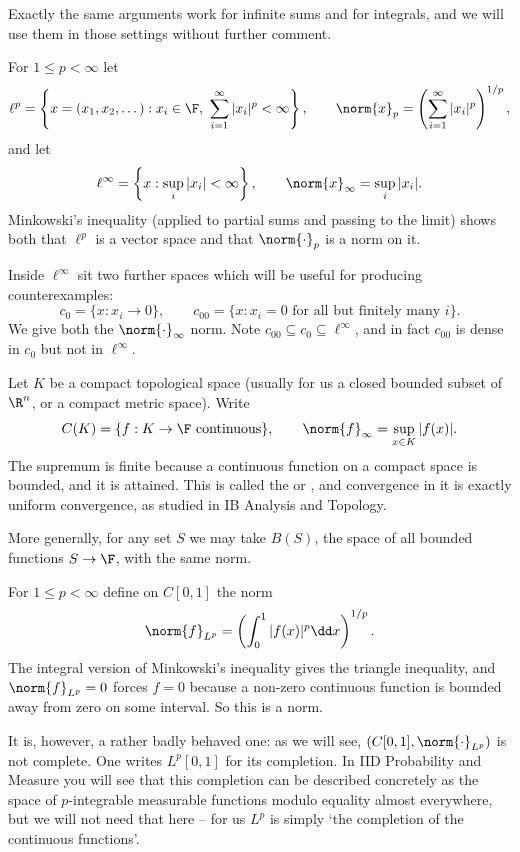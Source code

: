 Exactly the same arguments work for infinite sums and for integrals, and we will use them in those settings without further comment.

\begin{example}
	For $1 \leq p < \infty$ let
	$$\ell^p = \left\{ x = (x_1, x_2, \dots) : x_i \in \F, \ \sum_{i=1}^\infty |x_i|^p < \infty \right\}, \qquad \norm{x}_p = \left( \sum_{i=1}^\infty |x_i|^p \right)^{1/p},$$
	and let
	$$\ell^\infty = \left\{ x : \sup_i |x_i| < \infty \right\}, \qquad \norm{x}_\infty = \sup_i |x_i|.$$
	Minkowski's inequality (applied to partial sums and passing to the limit) shows both that $\ell^p$ is a vector space and that $\norm{\cdot}_p$ is a norm on it.

	Inside $\ell^\infty$ sit two further spaces which will be useful for producing counterexamples:
	$$c_0 = \{ x : x_i \to 0 \}, \qquad c_{00} = \{ x : x_i = 0 \text{ for all but finitely many } i \}.$$
	We give both the $\norm{\cdot}_\infty$ norm. Note $c_{00} \subseteq c_0 \subseteq \ell^\infty$, and in fact $c_{00}$ is dense in $c_0$ but not in $\ell^\infty$.
\end{example}

\begin{example}
	Let $K$ be a compact topological space (usually for us a closed bounded subset of $\R^n$, or a compact metric space). Write
	$$C(K) = \{ f : K \to \F \ \text{continuous} \}, \qquad \norm{f}_\infty = \sup_{x \in K} |f(x)|.$$
	The supremum is finite because a continuous function on a compact space is bounded, and it is attained. This is called the  or , and convergence in it is exactly uniform convergence, as studied in IB Analysis and Topology.

	More generally, for any set $S$ we may take $B(S)$, the space of all bounded functions $S \to \F$, with the same norm.
\end{example}

\begin{example}[$L^p$ spaces]
	For $1 \leq p < \infty$ define on $C[0,1]$ the norm
	$$\norm{f}_{L^p} = \left( \int_0^1 |f(x)|^p \dd x \right)^{1/p}.$$
	The integral version of Minkowski's inequality gives the triangle inequality, and $\norm{f}_{L^p} = 0$ forces $f = 0$ because a non-zero continuous function is bounded away from zero on some interval. So this is a norm.

	It is, however, a rather badly behaved one: as we will see, $(C[0,1], \norm{\cdot}_{L^p})$ is not complete. One writes $L^p[0,1]$ for its completion. In IID Probability and Measure you will see that this completion can be described concretely as the space of $p$-integrable measurable functions modulo equality almost everywhere, but we will not need that here -- for us $L^p$ is simply `the completion of the continuous functions'.
\end{example}

